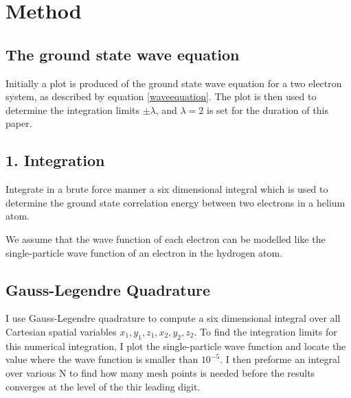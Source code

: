 \documentclass[%
reprint,
amsmath,amssymb,
aps,
]{revtex4-1}
\begin{document}
\section{Method}
\subsection{The ground state wave equation} \noindent 
Initially a plot is produced of the ground state wave equation for a two electron system, as described by equation \ref{waveequation}. The plot is then used to determine the integration limits $\pm \lambda$, and $\lambda = 2$ is set for the duration of this paper. 

\subsection{1. Integration}
Integrate in a brute force manner a six dimensional integral which is used to determine the ground state correlation energy between two electrons in a helium atom. 

We assume that the wave function of each electron can be modelled like the single-particle wave function of an electron in the hydrogen atom. 

\subsection*{Gauss-Legendre Quadrature}
I use Gauss-Legendre quadrature to compute a six dimensional integral over all Cartesian spatial variables $x_1, y_1, z_1, x_2,y_2,z_2$. To find the integration limits for this numerical integration, I plot the single-particle wave function and locate the value where the wave function is smaller than $10^{-5}$. I then preforme an integral over various N to find how many mesh points is needed before the results converges at the level of the thir leading digit. 
\newpage 
\end{document}

